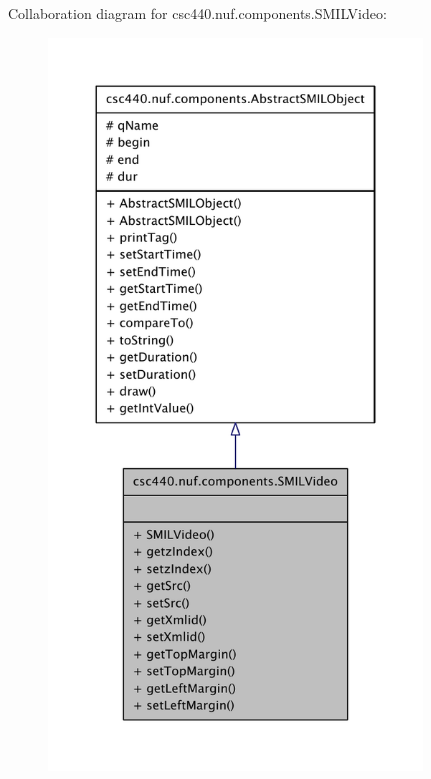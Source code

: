 Collaboration diagram for csc440.\-nuf.\-components.\-S\-M\-I\-L\-Video\-:
\nopagebreak
\begin{figure}[H]
\begin{center}
\leavevmode
\includegraphics[height=550pt]{classcsc440_1_1nuf_1_1components_1_1_s_m_i_l_video__coll__graph}
\end{center}
\end{figure}
